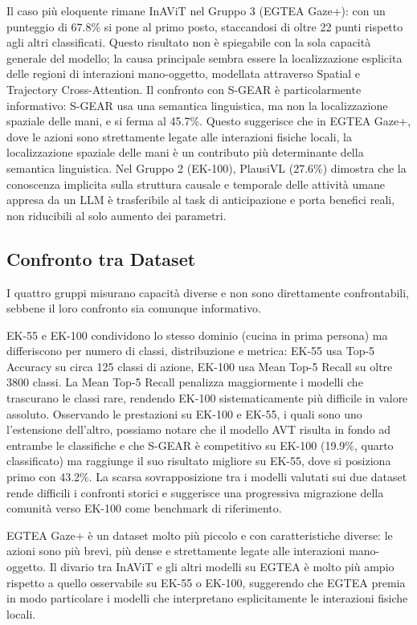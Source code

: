 Il caso più eloquente rimane InAViT \cite{roy2024interaction} nel Gruppo 3 (EGTEA Gaze+): con un punteggio di 67.8\% si pone al primo posto, staccandosi di oltre 22 punti rispetto agli altri classificati. Questo risultato non è spiegabile con la sola capacità generale del modello; la causa principale sembra essere la localizzazione esplicita delle regioni di interazioni mano-oggetto, modellata attraverso Spatial e Trajectory Cross-Attention. Il confronto con S-GEAR \cite{diko2024semantically} è particolarmente informativo: S-GEAR usa una semantica linguistica, ma non la localizzazione spaziale delle mani, e si ferma al 45.7\%. Questo suggerisce che in EGTEA Gaze+, dove le azioni sono strettamente legate alle interazioni fisiche locali, la localizzazione spaziale delle mani è un contributo più determinante della semantica linguistica.
Nel Gruppo 2 (EK-100), PlausiVL \cite{mittal2024can} (27.6\%) dimostra che la conoscenza implicita sulla struttura causale e temporale delle attività umane appresa da un LLM è trasferibile al task di anticipazione e porta benefici reali, non riducibili al solo aumento dei parametri.
\subsection{Confronto tra Dataset}
I quattro gruppi misurano capacità diverse e non sono direttamente confrontabili, sebbene il loro confronto sia comunque informativo.

EK-55 e EK-100 condividono lo stesso dominio (cucina in prima persona) ma differiscono per numero di classi, distribuzione e metrica: EK-55 usa Top-5 Accuracy su circa 125 classi di azione, EK-100 usa Mean Top-5 Recall su oltre 3800 classi. La Mean Top-5 Recall penalizza maggiormente i modelli che trascurano le classi rare, rendendo EK-100 sistematicamente più difficile in valore assoluto. Osservando le prestazioni su EK-100 e EK-55, i quali sono uno l'estensione dell’altro, possiamo notare che il modello AVT \cite{girdhar2021anticipative} risulta in fondo ad entrambe le classifiche e che S-GEAR \cite{diko2024semantically} è competitivo su EK-100 (19.9\%, quarto classificato) ma raggiunge il suo risultato migliore su EK-55, dove si posiziona primo con 43.2\%. La scarsa sovrapposizione tra i modelli valutati sui due dataset rende difficili i confronti storici e suggerisce una progressiva migrazione della comunità verso EK-100 come benchmark di riferimento.

EGTEA Gaze+ è un dataset molto più piccolo e con caratteristiche diverse: le azioni sono più brevi, più dense e strettamente legate alle interazioni mano-oggetto. Il divario tra InAViT \cite{roy2024interaction} e gli altri modelli su EGTEA è molto più ampio rispetto a quello osservabile su EK-55 o EK-100, suggerendo che EGTEA premia in modo particolare i modelli che interpretano esplicitamente le interazioni fisiche locali.

